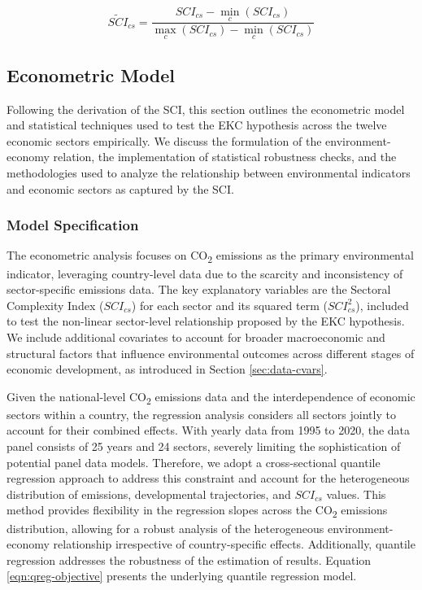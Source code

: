 \documentclass[10pt]{article}
\begin{document}
\begin{equation}\label{eqn:sci-norm}
 \widetilde{SCI}_{cs} = \frac{SCI_{cs} - \min_{c}(SCI_{cs})}{\max_{c}(SCI_{cs}) - \min_{c}(SCI_{cs})}
\end{equation}

\subsection{Econometric Model}

Following the derivation of the SCI, this section outlines the econometric model and statistical techniques used to test the EKC hypothesis across the twelve economic sectors empirically. We discuss the formulation of the environment-economy relation, the implementation of statistical robustness checks, and the methodologies used to analyze the relationship between environmental indicators and economic sectors as captured by the SCI.

\subsubsection{Model Specification}
The econometric analysis focuses on CO\textsubscript{2} emissions as the primary environmental indicator, leveraging country-level data due to the scarcity and inconsistency of sector-specific emissions data. The key explanatory variables are the Sectoral Complexity Index ($SCI_{cs}$) for each sector and its squared term ($SCI_{cs}^{2}$), included to test the non-linear sector-level relationship proposed by the EKC hypothesis. We include additional covariates to account for broader macroeconomic and structural factors that influence environmental outcomes across different stages of economic development, as introduced in Section \ref{sec:data-cvars}.

Given the national-level CO\textsubscript{2} emissions data and the interdependence of economic sectors within a country, the regression analysis considers all sectors jointly to account for their combined effects. With yearly data from 1995 to 2020, the data panel consists of 25 years and 24 sectors, severely limiting the sophistication of potential panel data models. Therefore, we adopt a cross-sectional quantile regression approach \citep{waldmannQuantileRegressionShort2018} to address this constraint and account for the heterogeneous distribution of emissions, developmental trajectories, and $SCI_{cs}$ values. This method provides flexibility in the regression slopes across the CO\textsubscript{2} emissions distribution, allowing for a robust analysis of the heterogeneous environment-economy relationship \citep{QRegArgument} irrespective of country-specific effects. Additionally, quantile regression addresses the robustness of the estimation of results. Equation \eqref{eqn:qreg-objective} presents the underlying quantile regression model.
\end{document}
